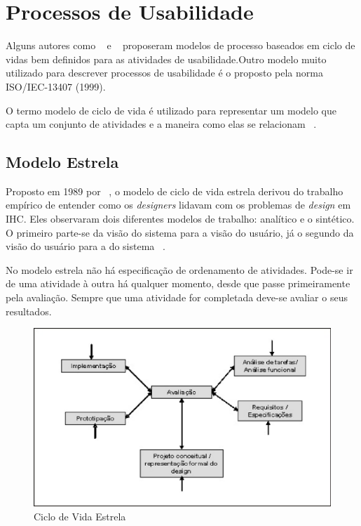 
\section{Processos de Usabilidade}


	Alguns autores como ~ e ~ proposeram modelos de processo baseados em ciclo de vidas bem definidos para as atividades de usabilidade.Outro modelo muito utilizado para descrever processos de usabilidade é o proposto pela norma ISO/IEC-13407 (1999).

	O termo modelo de ciclo de vida é utilizado para representar um modelo que capta um conjunto de atividades e a maneira como elas se relacionam ~\cite{preece2007}.

\subsection{Modelo Estrela}

	Proposto em 1989 por ~\citeauthor{hix1993}, o modelo de ciclo de vida estrela derivou do trabalho empírico de entender como os \emph{designers} lidavam com os problemas de \emph{design} em IHC. Eles observaram dois diferentes modelos de trabalho: analítico e o sintético. O primeiro parte-se da visão do sistema para a visão do usuário, já o segundo da visão do usuário para a do sistema ~\cite{cybis2010}.

	No modelo estrela não há especificação de ordenamento de atividades. Pode-se ir de uma atividade à outra há qualquer momento, desde que passe primeiramente pela avaliação. Sempre que uma atividade for completada deve-se avaliar o seus resultados.

\begin{figure}[h]
    \centering
    \includegraphics[keepaspectratio=true,scale=0.60]
      {figuras/estrela.eps}
    \caption{Ciclo de Vida Estrela}
    \label{ciclo_estrela}
\end{figure}

